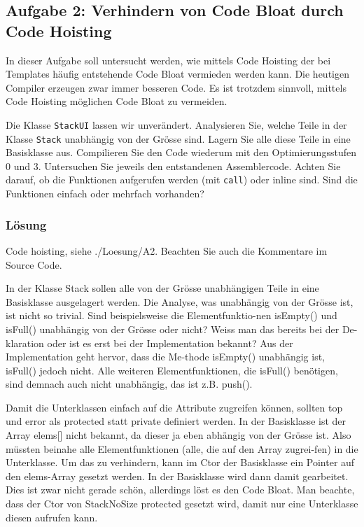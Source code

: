 \subsection{Aufgabe 2: Verhindern von Code Bloat durch Code Hoisting}

In dieser Aufgabe soll untersucht werden, wie mittels Code Hoisting der bei Templates häufig entstehende
Code Bloat vermieden werden kann. Die heutigen Compiler erzeugen zwar immer besseren Code. Es ist
trotzdem sinnvoll, mittels Code Hoisting möglichen Code Bloat zu vermeiden.

Die Klasse \texttt{StackUI} lassen wir unverändert. Analysieren Sie, welche Teile in der Klasse \texttt{Stack} unabhängig
von der Grösse sind. Lagern Sie alle diese Teile in eine Basisklasse aus.
Compilieren Sie den Code wiederum mit den Optimierungsstufen 0 und 3. Untersuchen Sie jeweils den entstandenen
Assemblercode. Achten Sie darauf, ob die Funktionen aufgerufen werden (mit \texttt{call}) oder inline
sind. Sind die Funktionen einfach oder mehrfach vorhanden?

\subsubsection{Lösung}


Code hoisting, siehe ./Loesung/A2. Beachten Sie auch die Kommentare im Source Code.

In der Klasse Stack sollen alle von der Grösse unabhängigen Teile in eine Basisklasse ausgelagert werden. Die Analyse, was unabhängig von der Grösse ist, ist nicht so trivial. Sind beispielsweise die Elementfunktio-nen isEmpty() und isFull() unabhängig von der Grösse oder nicht? Weiss man das bereits bei der De-klaration oder ist es erst bei der Implementation bekannt? Aus der Implementation geht hervor, dass die Me-thode isEmpty() unabhängig ist, isFull() jedoch nicht. Alle weiteren Elementfunktionen, die isFull() benötigen, sind demnach auch nicht unabhängig, das ist z.B. push().

Damit die Unterklassen einfach auf die Attribute zugreifen können, sollten top und error als protected statt private definiert werden. In der Basisklasse ist der Array elems[] nicht bekannt, da dieser ja eben abhängig von der Grösse ist. Also müssten beinahe alle Elementfunktionen (alle, die auf den Array zugrei-fen) in die Unterklasse. Um das zu verhindern, kann im Ctor der Basisklasse ein Pointer auf den elems-Array gesetzt werden. In der Basisklasse wird dann damit gearbeitet. Dies ist zwar nicht gerade schön, allerdings löst es den Code Bloat. Man beachte, dass der Ctor von StackNoSize protected gesetzt wird, damit nur eine Unterklasse diesen aufrufen kann.

